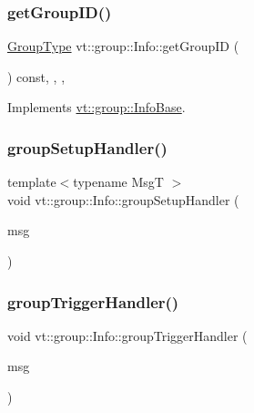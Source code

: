 \subsubsection{\texorpdfstring{get\+Group\+I\+D()}{getGroupID()}}
{\footnotesize\ttfamily \hyperlink{namespacevt_a27b5e4411c9b6140c49100e050e2f743}{Group\+Type} vt\+::group\+::\+Info\+::get\+Group\+ID (\begin{DoxyParamCaption}{ }\end{DoxyParamCaption}) const\hspace{0.3cm}{\ttfamily [inline]}, {\ttfamily [override]}, {\ttfamily [protected]}, {\ttfamily [virtual]}}



Implements \hyperlink{structvt_1_1group_1_1_info_base_afbb8a9919c924c50be2b99e2dc7cbca2}{vt\+::group\+::\+Info\+Base}.

\mbox{\label{structvt_1_1group_1_1_info_a8479ae53fed60033acca267e0918aa6f}} 
\subsubsection{\texorpdfstring{group\+Setup\+Handler()}{groupSetupHandler()}}
{\footnotesize\ttfamily template$<$typename MsgT $>$ \\
void vt\+::group\+::\+Info\+::group\+Setup\+Handler (\begin{DoxyParamCaption}\item[{MsgT $\ast$}]{msg }\end{DoxyParamCaption})\hspace{0.3cm}{\ttfamily [static]}}

\mbox{\label{structvt_1_1group_1_1_info_a4b457782f9b23a2ad6df129d6c4b1502}} 
\subsubsection{\texorpdfstring{group\+Trigger\+Handler()}{groupTriggerHandler()}}
{\footnotesize\ttfamily void vt\+::group\+::\+Info\+::group\+Trigger\+Handler (\begin{DoxyParamCaption}\item[{\hyperlink{namespacevt_1_1group_a864fcf6bc821eacf8350bf4ad15e51b3}{Group\+Only\+Msg} $\ast$}]{msg }\end{DoxyParamCaption})\hspace{0.3cm}{\ttfamily [static]}}

